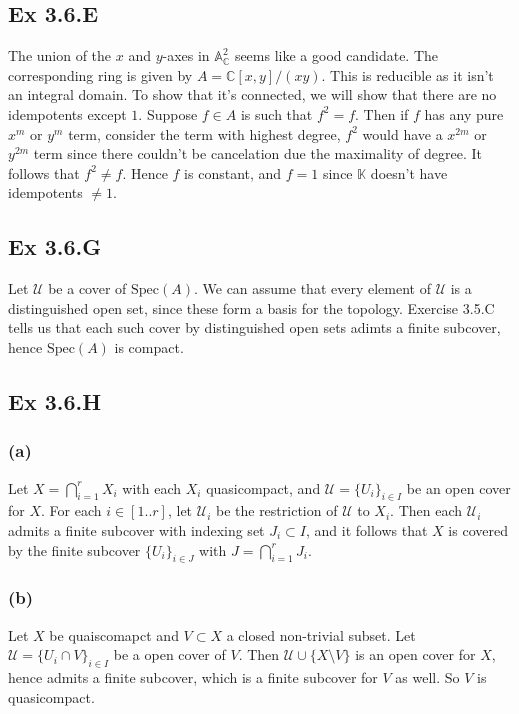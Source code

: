 \documentclass{article}
\theoremstyle{definition}
\newcommand{\C}{\mathbb{C}}
\newcommand{\K}{\mathbb{K}}
\newcommand{\A}{\mathbb{A}}
\newcommand{\Spec}{\text{Spec}}
\begin{document}
\subsection*{Ex 3.6.E}

The union of the $x$ and $y$-axes in $\A^2_{\C}$ seems like a good candidate.
The corresponding ring is given by $A = \C[x, y]/(xy)$. This is reducible as it
isn't an integral domain. To show that it's connected, we will show that there
are no idempotents except $1$. Suppose $f \in A$ is such that $f^2 = f$. Then
if $f$ has any pure $x^m$ or $y^m$ term, consider the term with highest degree,
$f^2$ would have a $x^{2m}$ or $y^{2m}$ term since there couldn't be
cancelation due the maximality of degree. It follows that $f^2 \not = f$. Hence
$f$ is constant, and $f = 1$ since $\K$ doesn't have idempotents $\not = 1$.

\subsection*{Ex 3.6.G}

Let $\mathcal{U}$ be a cover of $\Spec(A)$. We can assume that every element of
$\mathcal{U}$ is a distinguished open set, since these form a basis for the
topology. Exercise 3.5.C tells us that each such cover by distinguished open
sets adimts a finite subcover, hence $\Spec(A)$ is compact.

\subsection*{Ex 3.6.H}

\subsubsection*{(a)}

Let $X = \bigcap_{i = 1}^{r} X_i$ with each $X_i$ quasicompact, and
$\mathcal{U} = \{U_i\}_{i \in I}$ be an open cover for $X$. For each $i \in
[1..r]$, let $\mathcal{U}_i$ be the restriction of $\mathcal{U}$ to $X_i$. Then
each $\mathcal{U}_i$ admits a finite subcover with indexing set $J_i \subset
I$, and it follows that $X$ is covered by the finite subcover $\{U_i\}_{i \in
J}$ with $J = \bigcap_{i = 1}^{r} J_i$.

\subsubsection*{(b)}

Let $X$ be quaiscomapct and $V \subset X$ a closed non-trivial subset. Let
$\mathcal{U} = \{U_i \cap V\}_{i \in I}$ be a open cover of $V$. Then
$\mathcal{U} \cup \{X \setminus V\}$ is an open cover for $X$, hence admits a
finite subcover, which is a finite subcover for $V$ as well. So $V$ is
quasicompact.
\end{document}
